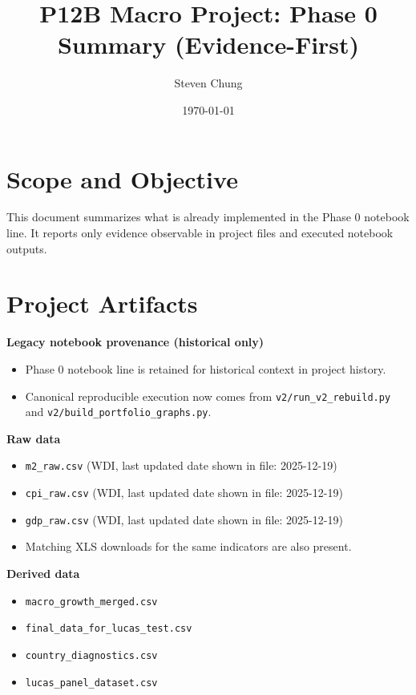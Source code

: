 \documentclass[11pt]{article}
\title{P12B Macro Project: Phase 0 Summary (Evidence-First)}
\author{Steven Chung}
\date{\today}
\begin{document}
\maketitle

\section{Scope and Objective}
This document summarizes what is already implemented in the Phase 0 notebook line. It reports only evidence observable in project files and executed notebook outputs.

\section{Project Artifacts}
\textbf{Legacy notebook provenance (historical only)}
\begin{itemize}
\item Phase 0 notebook line is retained for historical context in project history.
\item Canonical reproducible execution now comes from \texttt{v2/run\_v2\_rebuild.py} and \texttt{v2/build\_portfolio\_graphs.py}.
\end{itemize}

\textbf{Raw data}
\begin{itemize}
\item \texttt{m2\_raw.csv} (WDI, last updated date shown in file: 2025-12-19)
\item \texttt{cpi\_raw.csv} (WDI, last updated date shown in file: 2025-12-19)
\item \texttt{gdp\_raw.csv} (WDI, last updated date shown in file: 2025-12-19)
\item Matching XLS downloads for the same indicators are also present.
\end{itemize}

\textbf{Derived data}
\begin{itemize}
\item \texttt{macro\_growth\_merged.csv}
\item \texttt{final\_data\_for\_lucas\_test.csv}
\item \texttt{country\_diagnostics.csv}
\item \texttt{lucas\_panel\_dataset.csv}
\end{itemize}
\end{document}
